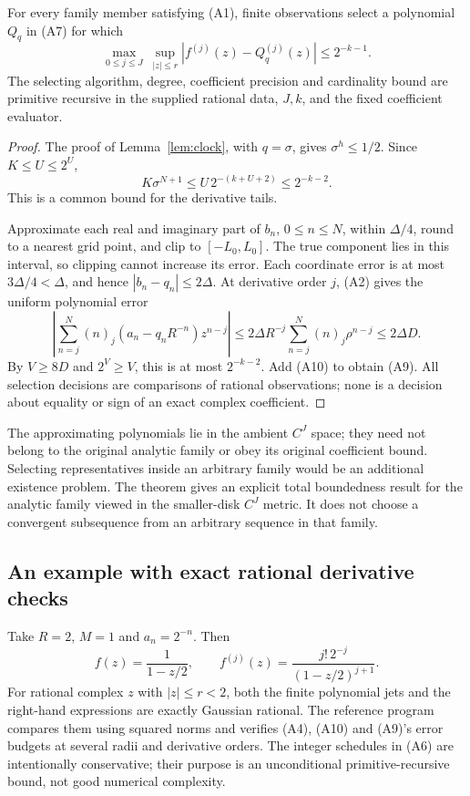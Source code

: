 \begin{theorem}
\label{thm:analytic-entropy}
For every family member satisfying (A1), finite observations select a
polynomial \(Q_q\) in (A7) for which
\[
 \max_{0\leq j\leq J}\ 
        \sup_{|z|\leq r}|f^{(j)}(z)-Q_q^{(j)}(z)|
                        \leq2^{-k-1}.
\tag{A9}
\]
The selecting algorithm, degree, coefficient precision and cardinality
bound are primitive recursive in the supplied rational data, \(J,k\),
and the fixed coefficient evaluator.
\end{theorem}
\begin{proof}
The proof of Lemma~\ref{lem:clock}, with \(q=\sigma\), gives
\(\sigma^h\leq1/2\). Since \(K\leq U\leq2^U\),
\[
K\sigma^{N+1}\leq U\,2^{-(k+U+2)}\leq2^{-k-2}.
\tag{A10}
\]
This is a common bound for the derivative tails.

Approximate each real and imaginary part of \(b_n\), \(0\leq n\leq N\),
within \(\Delta/4\), round to a nearest grid point, and clip to
\([-L_0,L_0]\). The true component lies in this interval, so clipping cannot
increase its error. Each coordinate error is at most \(3\Delta/4<\Delta\),
and hence \(|b_n-q_n|\leq2\Delta\).
At derivative order \(j\), (A2) gives the uniform polynomial error
\[
\left|\sum_{n=j}^N(n)_j(a_n-q_nR^{-n})z^{n-j}\right|
 \leq 2\Delta R^{-j}\sum_{n=j}^N(n)_j\rho^{n-j}
 \leq2\Delta D.
\]
By \(V\geq8D\) and \(2^V\geq V\), this is at most \(2^{-k-2}\).
Add (A10) to obtain (A9).
All selection decisions are comparisons of rational observations; none
is a decision about equality or sign of an exact complex coefficient.
\end{proof}

The approximating polynomials lie in the ambient \(C^J\) space; they need not
belong to the original analytic family or obey its original coefficient
bound. Selecting representatives inside an arbitrary family would be
an additional existence problem. The theorem gives an explicit total
boundedness result for the analytic family viewed in the smaller-disk
\(C^J\) metric. It does not choose a convergent subsequence from an arbitrary
sequence in that family.

\subsection{An example with exact rational derivative checks}

Take \(R=2\), \(M=1\) and \(a_n=2^{-n}\). Then
\[
                      f(z)=\frac1{1-z/2},\qquad
          f^{(j)}(z)=\frac{j!\,2^{-j}}{(1-z/2)^{j+1}}.
\]
For rational complex \(z\) with \(|z|\leq r<2\), both the finite polynomial
jets and the right-hand expressions are exactly Gaussian rational.
The reference program compares them using squared norms and verifies
(A4), (A10) and (A9)'s error budgets at several radii and derivative orders.
The integer schedules in (A6) are intentionally conservative; their purpose
is an unconditional primitive-recursive bound, not good numerical complexity.

